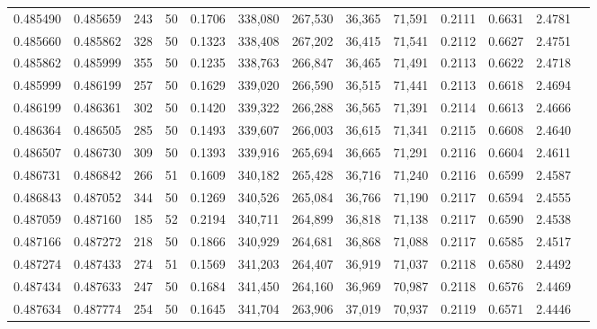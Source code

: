 \begin{tabular}{rrrrrrrrrrrrr}
0.485490 & 0.485659 &   243 &  50 &                                     0.1706 & 338,080 & 267,530 &  36,365 &  71,591 & 0.2111 & 0.6631 & 2.4781 \\
0.485660 & 0.485862 &   328 &  50 &                                     0.1323 & 338,408 & 267,202 &  36,415 &  71,541 & 0.2112 & 0.6627 & 2.4751 \\
0.485862 & 0.485999 &   355 &  50 &                                     0.1235 & 338,763 & 266,847 &  36,465 &  71,491 & 0.2113 & 0.6622 & 2.4718 \\
0.485999 & 0.486199 &   257 &  50 &                                     0.1629 & 339,020 & 266,590 &  36,515 &  71,441 & 0.2113 & 0.6618 & 2.4694 \\
0.486199 & 0.486361 &   302 &  50 &                                     0.1420 & 339,322 & 266,288 &  36,565 &  71,391 & 0.2114 & 0.6613 & 2.4666 \\
0.486364 & 0.486505 &   285 &  50 &                                     0.1493 & 339,607 & 266,003 &  36,615 &  71,341 & 0.2115 & 0.6608 & 2.4640 \\
0.486507 & 0.486730 &   309 &  50 &                                     0.1393 & 339,916 & 265,694 &  36,665 &  71,291 & 0.2116 & 0.6604 & 2.4611 \\
0.486731 & 0.486842 &   266 &  51 &                                     0.1609 & 340,182 & 265,428 &  36,716 &  71,240 & 0.2116 & 0.6599 & 2.4587 \\
0.486843 & 0.487052 &   344 &  50 &                                     0.1269 & 340,526 & 265,084 &  36,766 &  71,190 & 0.2117 & 0.6594 & 2.4555 \\
0.487059 & 0.487160 &   185 &  52 &                                     0.2194 & 340,711 & 264,899 &  36,818 &  71,138 & 0.2117 & 0.6590 & 2.4538 \\
0.487166 & 0.487272 &   218 &  50 &                                     0.1866 & 340,929 & 264,681 &  36,868 &  71,088 & 0.2117 & 0.6585 & 2.4517 \\
0.487274 & 0.487433 &   274 &  51 &                                     0.1569 & 341,203 & 264,407 &  36,919 &  71,037 & 0.2118 & 0.6580 & 2.4492 \\
0.487434 & 0.487633 &   247 &  50 &                                     0.1684 & 341,450 & 264,160 &  36,969 &  70,987 & 0.2118 & 0.6576 & 2.4469 \\
0.487634 & 0.487774 &   254 &  50 &                                     0.1645 & 341,704 & 263,906 &  37,019 &  70,937 & 0.2119 & 0.6571 & 2.4446 \\

\end{tabular}
